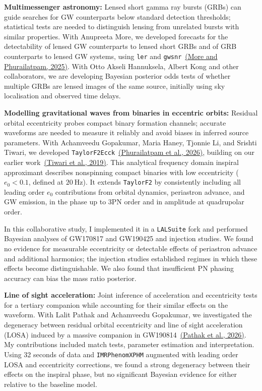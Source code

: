 \documentclass[margin,line]{res}
\begin{document}
\begin{resume}
{\bf Multimessenger astronomy:}
Lensed short gamma ray bursts (GRBs) can guide searches for GW counterparts below standard detection thresholds; statistical tests are needed to distinguish lensing from unrelated bursts with similar properties. With Anupreeta More, we developed forecasts for the detectability of lensed GW counterparts to lensed short GRBs and of GRB counterparts to lensed GW systems, using \texttt{ler} and \texttt{gwsnr}~\href{https://arxiv.org/abs/2502.02536}{(More and Phurailatpam, 2025)}. With Otto Akseli Hannuksela, Albert Kong and other collaborators, we are developing Bayesian posterior odds tests of whether multiple GRBs are lensed images of the same source, initially using sky localisation and observed time delays.

{\bf Modelling gravitational waves from binaries in eccentric orbits:}
Residual orbital eccentricity probes compact binary formation channels; accurate waveforms are needed to measure it reliably and avoid biases in inferred source parameters. With Achamveedu Gopakumar, Maria Haney, Tjonnie Li, and Srishti Tiwari, we developed \texttt{TaylorF2Ecck}~\href{https://arxiv.org/abs/2508.12697}{(Phurailatpam et al., 2026)}, building on our earlier work~\href{https://arxiv.org/abs/1905.07956}{(Tiwari et al., 2019)}. This analytical frequency domain inspiral approximant describes nonspinning compact binaries with low eccentricity ($e_0<0.1$, defined at $20~\mathrm{Hz}$). It extends \texttt{TaylorF2} by consistently including all leading order $e_0$ contributions from orbital dynamics, periastron advance, and GW emission, in the phase up to 3PN order and in amplitude at quadrupolar order.

In this collaborative study, I implemented it in a \texttt{LALSuite} fork and performed Bayesian analyses of GW170817 and GW190425 and injection studies. We found no evidence for measurable eccentricity or detectable effects of periastron advance and additional harmonics; the injection studies established regimes in which these effects become distinguishable. We also found that insufficient PN phasing accuracy can bias the mass ratio posterior.

\textbf{Line of sight acceleration:} Joint inference of acceleration and eccentricity tests for a tertiary companion while accounting for their similar effects on the waveform. With Lalit Pathak and Achamveedu Gopakumar, we investigated the degeneracy between residual orbital eccentricity and line of sight acceleration (LOSA) induced by a massive companion in GW190814~\href{https://arxiv.org/abs/2605.21955}{(Pathak et al., 2026)}. My contributions included match tests, parameter estimation and interpretation. Using 32 seconds of data and \texttt{IMRPhenomXPHM} augmented with leading order LOSA and eccentricity corrections, we found a strong degeneracy between their effects on the inspiral phase, but no significant Bayesian evidence for either relative to the baseline model.


\end{resume}
\end{document}
